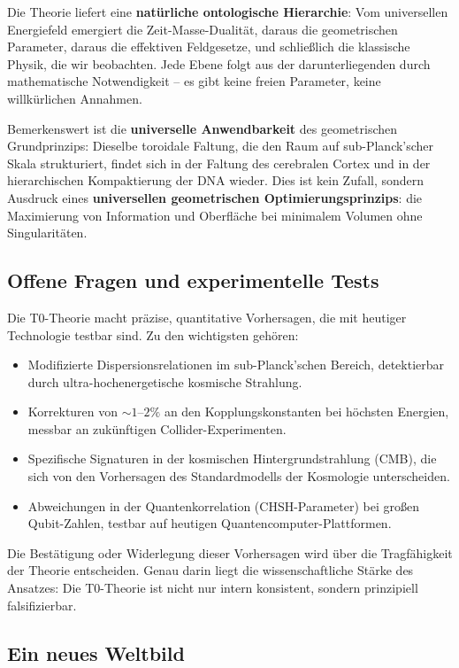 \documentclass[11pt,openright,twoside]{book}
\begin{document}
Die Theorie liefert eine \textbf{natürliche ontologische Hierarchie}: Vom universellen Energiefeld emergiert die Zeit-Masse-Dualität, daraus die geometrischen Parameter, daraus die effektiven Feldgesetze, und schließlich die klassische Physik, die wir beobachten. Jede Ebene folgt aus der darunterliegenden durch mathematische Notwendigkeit -- es gibt keine freien Parameter, keine willkürlichen Annahmen.

Bemerkenswert ist die \textbf{universelle Anwendbarkeit} des geometrischen Grundprinzips: Dieselbe toroidale Faltung, die den Raum auf sub-Planck'scher Skala strukturiert, findet sich in der Faltung des cerebralen Cortex und in der hierarchischen Kompaktierung der DNA wieder. Dies ist kein Zufall, sondern Ausdruck eines \textbf{universellen geometrischen Optimierungsprinzips}: die Maximierung von Information und Oberfläche bei minimalem Volumen ohne Singularitäten.

\subsection*{Offene Fragen und experimentelle Tests}

Die T0-Theorie macht präzise, quantitative Vorhersagen, die mit heutiger Technologie testbar sind. Zu den wichtigsten gehören:

\begin{itemize}[label=$\bullet$]
	\item Modifizierte Dispersionsrelationen im sub-Planck'schen Bereich, detektierbar durch ultra-hochenergetische kosmische Strahlung.
	\item Korrekturen von $\sim 1$--$2\%$ an den Kopplungskonstanten bei höchsten Energien, messbar an zukünftigen Collider-Experimenten.
	\item Spezifische Signaturen in der kosmischen Hintergrundstrahlung (CMB), die sich von den Vorhersagen des Standardmodells der Kosmologie unterscheiden.
	\item Abweichungen in der Quantenkorrelation (CHSH-Parameter) bei großen Qubit-Zahlen, testbar auf heutigen Quantencomputer-Plattformen.
\end{itemize}

Die Bestätigung oder Widerlegung dieser Vorhersagen wird über die Tragfähigkeit der Theorie entscheiden. Genau darin liegt die wissenschaftliche Stärke des Ansatzes: Die T0-Theorie ist nicht nur intern konsistent, sondern prinzipiell falsifizierbar.

\subsection*{Ein neues Weltbild}
\end{document}
